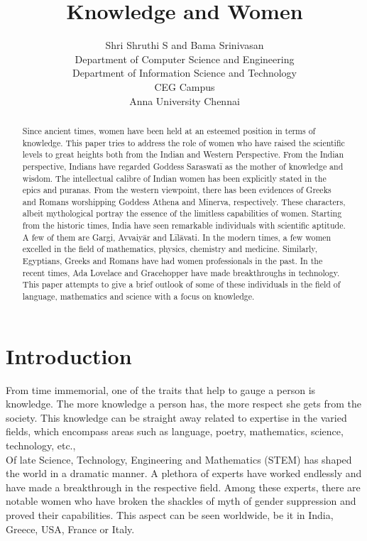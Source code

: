 \documentclass[a4paper,10pt]{article}
\title{Knowledge and Women}
\author{Shri Shruthi S and Bama Srinivasan \\  Department of Computer Science and Engineering \\  Department of Information Science and Technology \\ CEG Campus \\Anna University Chennai}
\date{}
\begin{document}
\maketitle

\begin{abstract}
Since ancient times, women have been held at an esteemed position in terms of knowledge. This paper tries to address the role of women who have raised the scientific levels to great heights both from the Indian and Western Perspective. From the Indian perspective, Indians have regarded Goddess Saraswat\={i} as the mother of knowledge and wisdom. The intellectual calibre of Indian women has been explicitly stated in the epics and puranas. From the western viewpoint,  there has been evidences of Greeks and Romans worshipping Goddess Athena and Minerva, respectively. These characters, albeit mythological portray the essence of the limitless capabilities of women. Starting from the historic times, India have seen remarkable individuals with scientific aptitude. A few of them are Gargi, Avvaiy\={a}r and L\={i}l\={a}vati. In the modern times, a few women excelled in the field of mathematics, physics, chemistry and medicine. Similarly, Egyptians, Greeks and Romans have had women professionals in the past. In the recent times, Ada Lovelace and Gracehopper have made breakthroughs in technology. This paper attempts to give a brief outlook of some of these individuals in the field of language, mathematics and science with a focus on knowledge. 
\end{abstract}
\section{Introduction}
From time immemorial, one of the traits that help to gauge a person is knowledge. The more knowledge a person has, the more respect she gets from the society. This knowledge can be straight away related to expertise in the varied fields, which encompass areas such as language, poetry, mathematics, science, technology, etc., 
\\

Of late Science, Technology, Engineering and Mathematics (STEM) has shaped the world in a dramatic manner. A plethora of experts have worked endlessly and have made a breakthrough in the respective field. Among these experts, there are notable women who have broken the shackles of myth of gender suppression and proved their capabilities. This aspect can be seen worldwide, be it in India, Greece, USA, France or Italy. 
\\
\end{document}
